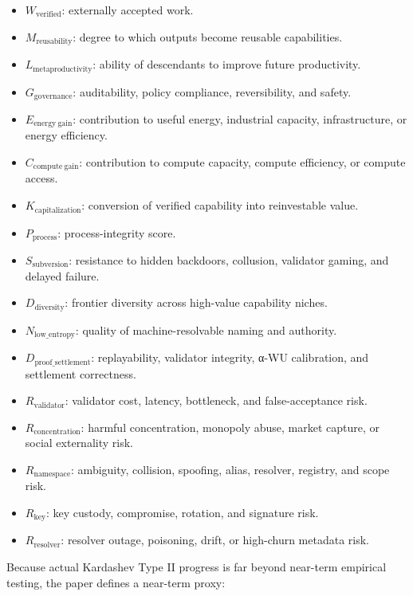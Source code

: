 \documentclass[
  11pt,
]{article}
\providecommand{\tightlist}{%
  \setlength{\itemsep}{0pt}\setlength{\parskip}{0pt}}
\begin{document}
\begin{itemize}
\tightlist
\item
  \(W_{\mathrm{verified}}\): externally accepted work.
\item
  \(M_{\mathrm{reusability}}\): degree to which outputs become reusable
  capabilities.
\item
  \(L_{\mathrm{metaproductivity}}\): ability of descendants to improve
  future productivity.
\item
  \(G_{\mathrm{governance}}\): auditability, policy compliance,
  reversibility, and safety.
\item
  \(E_{\mathrm{energy\ gain}}\): contribution to useful energy,
  industrial capacity, infrastructure, or energy efficiency.
\item
  \(C_{\mathrm{compute\ gain}}\): contribution to compute capacity,
  compute efficiency, or compute access.
\item
  \(K_{\mathrm{capitalization}}\): conversion of verified capability
  into reinvestable value.
\item
  \(P_{\mathrm{process}}\): process-integrity score.
\item
  \(S_{\mathrm{subversion}}\): resistance to hidden backdoors,
  collusion, validator gaming, and delayed failure.
\item
  \(D_{\mathrm{diversity}}\): frontier diversity across high-value
  capability niches.
\item
  \(N_{\mathrm{low\_entropy}}\): quality of machine-resolvable naming
  and authority.
\item
  \(D_{\mathrm{proof\_settlement}}\): replayability, validator
  integrity, α-WU calibration, and settlement correctness.
\item
  \(R_{\mathrm{validator}}\): validator cost, latency, bottleneck, and
  false-acceptance risk.
\item
  \(R_{\mathrm{concentration}}\): harmful concentration, monopoly abuse,
  market capture, or social externality risk.
\item
  \(R_{\mathrm{namespace}}\): ambiguity, collision, spoofing, alias,
  resolver, registry, and scope risk.
\item
  \(R_{\mathrm{key}}\): key custody, compromise, rotation, and signature
  risk.
\item
  \(R_{\mathrm{resolver}}\): resolver outage, poisoning, drift, or
  high-churn metadata risk.
\end{itemize}

Because actual Kardashev Type II progress is far beyond near-term
empirical testing, the paper defines a near-term proxy:
\end{document}
